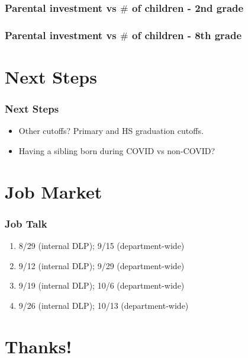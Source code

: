 \documentclass{beamer}
\begin{document}
\begin{frame}
    \frametitle{Parental investment vs $\#$ of children - 2nd grade}
    
\end{frame}

\begin{frame}
    \frametitle{Parental investment vs $\#$  of children - 8th grade}
    
\end{frame}



\section{Next Steps}

\begin{frame}
    \label{update_scott}
    \frametitle{Next Steps}
    \begin{itemize}
        \item Other cutoffs? Primary and HS graduation cutoffs.
        \item Having a sibling born during COVID vs non-COVID?
    \end{itemize}
\end{frame}

\section{Job Market}

\begin{frame}
    \label{update_scott}
    \frametitle{Job Talk}
    \begin{enumerate}
        \item 8/29 (internal DLP); 9/15 (department-wide)
        \item 9/12 (internal DLP); 9/29 (department-wide)
        \item 9/19 (internal DLP); 10/6 (department-wide)
        \item 9/26 (internal DLP); 10/13 (department-wide)
    \end{enumerate}
\end{frame}



\section{Thanks!}
\end{document}
